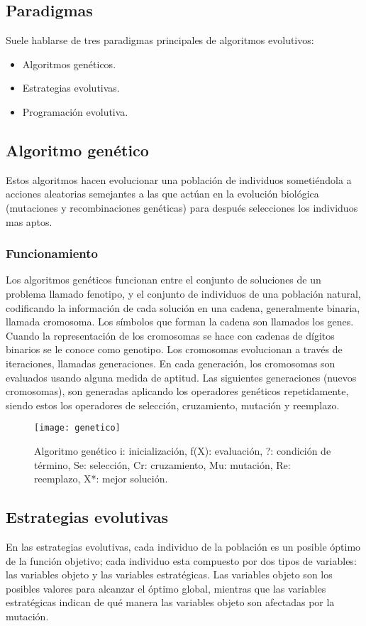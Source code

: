 \documentclass[
]{article}
\begin{document}
\subsection{Paradigmas}
Suele hablarse de tres paradigmas principales de algoritmos evolutivos:
\begin{itemize}
	\item Algoritmos genéticos.
	\item Estrategias evolutivas.
	\item Programación evolutiva.
	
	
\end{itemize}

\subsection{Algoritmo genético}
Estos algoritmos hacen evolucionar una población de individuos sometiéndola a acciones aleatorias semejantes a las que actúan en la evolución biológica (mutaciones y recombinaciones genéticas) para después selecciones los individuos mas aptos.
\subsubsection{Funcionamiento}
Los algoritmos genéticos funcionan entre el conjunto de soluciones de un problema llamado fenotipo, y el conjunto de individuos de una población natural, codificando la información de cada solución en una cadena, generalmente binaria, llamada cromosoma. Los símbolos que forman la cadena son llamados los genes. Cuando la representación de los cromosomas se hace con cadenas de dígitos binarios se le conoce como genotipo. Los cromosomas evolucionan a través de iteraciones, llamadas generaciones. En cada generación, los cromosomas son evaluados usando alguna medida de aptitud. Las siguientes generaciones (nuevos cromosomas), son generadas aplicando los operadores genéticos repetidamente, siendo estos los operadores de selección, cruzamiento, mutación y reemplazo.


\begin{figure}[h]
  \centering
    \texttt{[image: genetico]}
  \caption{Algoritmo genético i: inicialización, f(X): evaluación, ?: condición de término, Se: selección, Cr: cruzamiento, Mu: mutación, Re: reemplazo, X*: mejor solución.}
  \label{fig:ejemplo}
\end{figure}

\subsection{Estrategias evolutivas}
En las estrategias evolutivas, cada individuo de la población es un posible óptimo de la función objetivo; cada individuo esta compuesto por dos tipos de variables: las variables objeto y las variables estratégicas. Las variables objeto son los posibles valores para alcanzar el óptimo global, mientras que las variables estratégicas indican de qué manera las variables objeto son afectadas por la mutación.
\end{document}
